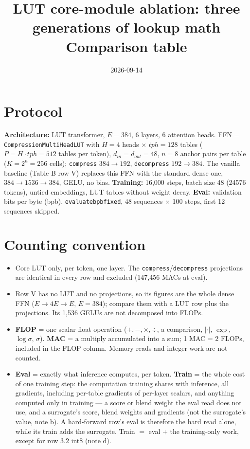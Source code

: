 \documentclass[10pt]{article}
\title{LUT core-module ablation: three generations of lookup math\\[2pt]
\large Comparison table}
\date{2026-09-14}
\author{}
\newcommand{\code}[1]{{\renewcommand{\_}{\textunderscore\allowbreak}\texttt{#1}}}
\begin{document}
\maketitle
\vspace{-2.5em}

\section*{Protocol}
\textbf{Architecture:} LUT transformer, $E=384$, 6 layers, 6 attention heads. FFN = \code{CompressionMultiHeadLUT} with $H=4$ heads $\times$ $tph=128$ tables
($P=H\cdot tph=512$ tables per token), $d_{in}=d_{out}=48$, $n=8$ anchor pairs per table ($K=2^n=256$ cells); \code{compress} $384\to192$, \code{decompress} $192\to384$.
The vanilla baseline (Table B row V) replaces this FFN with the standard dense one, $384\to1536\to384$, GELU, no bias.
\textbf{Training:} 16{,}000 steps, batch size 48 (24576 tokens), untied embeddings, LUT tables without weight decay.
\textbf{Eval:} validation bits per byte (bpb), \code{evaluate\_bpb\_fixed}, 48 sequences $\times$ 100 steps, first 12 sequences skipped.


\section*{Counting convention}
\begin{itemize}\setlength\itemsep{0pt}
\item Core LUT only, per token, one layer. The \code{compress}/\code{decompress} projections are identical in every row and excluded (147,456 MACs at eval).
\item Row V has no LUT and no projections, so its figures are the whole dense FFN ($E\to4E\to E$, $E=384$); compare them with a LUT row plus the projections. Its 1,536 GELUs are not decomposed into FLOPs.
\item \textbf{FLOP} = one scalar float operation ($+,-,\times,\div$, a comparison, $|\cdot|$, $\exp$, $\log\sigma$, $\sigma$). \textbf{MAC} = a multiply accumulated into a sum; 1 MAC = 2 FLOPs,
  included in the FLOP column. Memory reads and integer work are not counted.
\item \textbf{Eval} = exactly what inference computes, per token. \textbf{Train} = the whole cost of one training step: the computation training shares with inference, all gradients, including per-table gradients of per-layer scalars,
  and anything computed only in training --- a score or blend weight the eval read does not use, and a surrogate's score, blend weights and gradients (not the surrogate's value, note b).
  A hard-forward row's eval is therefore the hard read alone, while its train adds the surrogate. Train $=$ eval $+$ the training-only work, except for row 3.2 int8 (note d).
\end{itemize}
\end{document}
